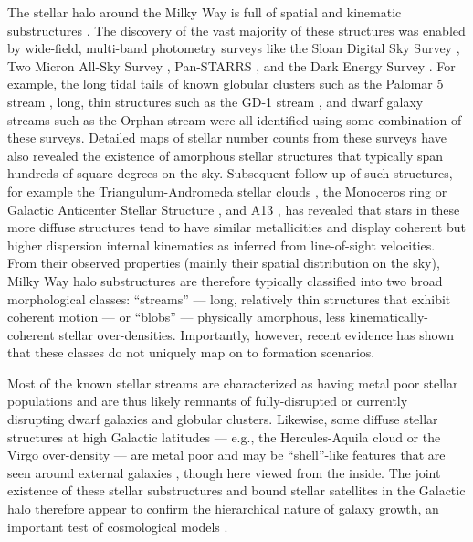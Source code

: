 \documentclass[modern]{aastex62}
\begin{document}
The stellar halo around the Milky Way is full of spatial and kinematic
substructures \citep[e.g.,][]{Grillmair:2016}.
The discovery of the vast majority of these structures was enabled by
wide-field, multi-band photometry surveys like the Sloan Digital Sky Survey
\cite[SDSS;][]{York:2000, Gunn:2006, Eisenstein:2011}, Two Micron All-Sky Survey
\citep[2MASS;][]{Skrutskie:2006}, Pan-STARRS \citep[PS1;][]{Chambers:2016}, and
the Dark Energy Survey \citep[DES;][]{Dark-Energy-Survey-Collaboration:2016}.
For example, the long tidal tails of known globular clusters such as the Palomar
5 stream \citep{Odenkirchen:2001}, long, thin structures such as the GD-1 stream
\citep{Grillmair:2006}, and dwarf galaxy streams such as the Orphan stream
\citep{Grillmair:2006a} were all identified using some combination of these
surveys.
Detailed maps of stellar number counts from these surveys have also revealed the
existence of amorphous stellar structures that typically span hundreds of square
degrees on the sky.
Subsequent follow-up of such structures, for example the Triangulum-Andromeda
stellar clouds \citep[TriAnd;][]{Rocha-Pinto:2004, Martin:2007, Sheffield:2014},
the Monoceros ring or Galactic Anticenter Stellar Structure
\citep[Mon/GASS;][]{Newberg:2002, Yanny:2003, Crane:2003, Li:2012,
Morganson:2016}, and A13 \citep{Sharma:2010, Li:2017}, has revealed that stars
in these more diffuse structures tend to have similar metallicities and display
coherent but higher dispersion internal kinematics as inferred from
line-of-sight velocities.
From their observed properties (mainly their spatial distribution on the sky),
Milky Way halo substructures are therefore typically classified into two broad
morphological classes: ``streams'' --- long, relatively thin structures that
exhibit coherent motion --- or ``blobs'' --- physically amorphous, less
kinematically-coherent stellar over-densities.
Importantly, however, recent evidence has shown that these classes do not
uniquely map on to formation scenarios.

Most of the known stellar streams are characterized as having metal poor stellar
populations and are thus likely remnants of fully-disrupted or currently
disrupting dwarf galaxies and globular clusters.
Likewise, some diffuse stellar structures at high Galactic latitudes --- e.g.,
the Hercules-Aquila cloud \citep{Belokurov:2007, Simion:2014} or the Virgo
over-density \citep{Vivas:2001, Carlin:2012} --- are metal poor and may be
``shell''-like features that are seen around external galaxies
\citep[e.g.,][]{Kado-Fong:2018}, though here viewed from the inside.
The joint existence of these stellar substructures and bound stellar satellites
in the Galactic halo therefore appear to confirm the hierarchical nature of
galaxy growth, an important test of cosmological models \citep{Bullock:2005,
Johnston:2008}.
\end{document}
